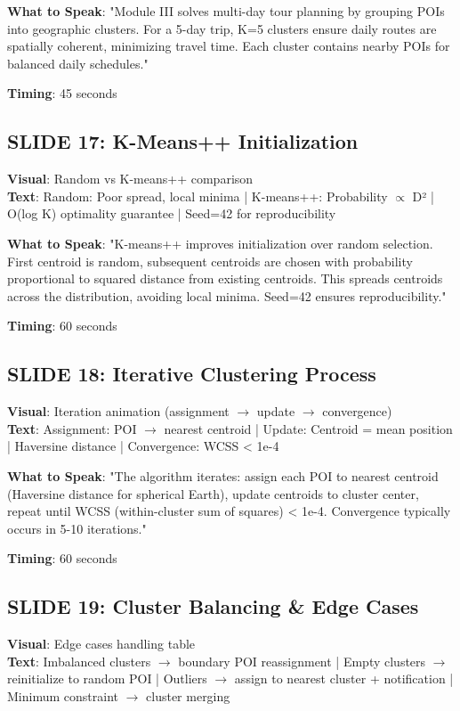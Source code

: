 \documentclass[12pt]{article}
\begin{document}
\textbf{What to Speak}:
"Module III solves multi-day tour planning by grouping POIs into geographic clusters. For a 5-day trip, K=5 clusters ensure daily routes are spatially coherent, minimizing travel time. Each cluster contains nearby POIs for balanced daily schedules."

\textbf{Timing}: 45 seconds

\subsection{SLIDE 17: K-Means++ Initialization}
\textbf{Visual}: Random vs K-means++ comparison \\
\textbf{Text}: Random: Poor spread, local minima | K-means++: Probability $\propto$ D² | O(log K) optimality guarantee | Seed=42 for reproducibility

\textbf{What to Speak}:
"K-means++ improves initialization over random selection. First centroid is random, subsequent centroids are chosen with probability proportional to squared distance from existing centroids. This spreads centroids across the distribution, avoiding local minima. Seed=42 ensures reproducibility."

\textbf{Timing}: 60 seconds

\subsection{SLIDE 18: Iterative Clustering Process}
\textbf{Visual}: Iteration animation (assignment $\rightarrow$ update $\rightarrow$ convergence) \\
\textbf{Text}: Assignment: POI $\rightarrow$ nearest centroid | Update: Centroid = mean position | Haversine distance | Convergence: WCSS < 1e-4

\textbf{What to Speak}:
"The algorithm iterates: assign each POI to nearest centroid (Haversine distance for spherical Earth), update centroids to cluster center, repeat until WCSS (within-cluster sum of squares) < 1e-4. Convergence typically occurs in 5-10 iterations."

\textbf{Timing}: 60 seconds

\subsection{SLIDE 19: Cluster Balancing \& Edge Cases}
\textbf{Visual}: Edge cases handling table \\
\textbf{Text}: Imbalanced clusters $\rightarrow$ boundary POI reassignment | Empty clusters $\rightarrow$ reinitialize to random POI | Outliers $\rightarrow$ assign to nearest cluster + notification | Minimum constraint $\rightarrow$ cluster merging
\end{document}
